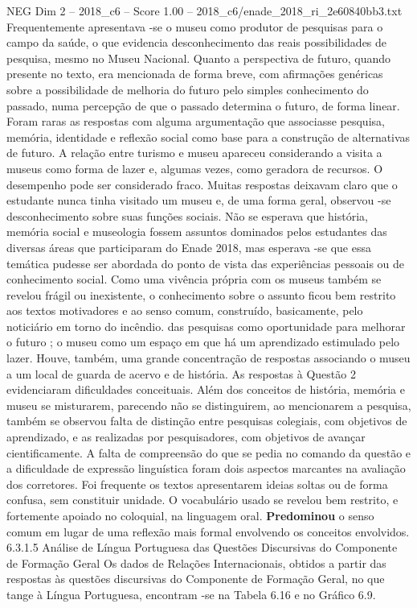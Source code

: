 \begin{textsample}{NEG Dim 2 – 2018\_c6 – Score 1.00 – 2018\_c6/enade\_2018\_ri\_2e60840bb3.txt}
Frequentemente apresentava -se o museu como produtor de pesquisas para o campo da saúde, o que evidencia desconhecimento das reais possibilidades de pesquisa, mesmo no Museu Nacional.
Quanto a perspectiva de futuro, quando presente no texto, era mencionada de forma breve, com afirmações genéricas sobre a possibilidade de melhoria do futuro pelo simples conhecimento do passado, numa percepção de que o passado determina o futuro, de forma linear.
Foram raras as respostas com alguma argumentação que associasse pesquisa, memória, identidade e reflexão social como base para a construção de alternativas de futuro.
A relação entre turismo e museu apareceu considerando a visita a museus como forma de lazer e, algumas vezes, como geradora de recursos.
O desempenho pode ser considerado fraco.
Muitas respostas deixavam claro que o estudante nunca tinha visitado um museu e, de uma forma geral, observou -se desconhecimento sobre suas funções sociais.
Não se esperava que história, memória social e museologia fossem assuntos dominados pelos estudantes das diversas áreas que participaram do Enade 2018, mas esperava -se que essa temática pudesse ser abordada do ponto de vista das experiências pessoais ou de conhecimento social.
Como uma vivência própria com os museus também se revelou frágil ou inexistente, o conhecimento sobre o assunto ficou bem restrito aos textos motivadores e ao senso comum, construído, basicamente, pelo noticiário em torno do incêndio. das pesquisas como oportunidade para melhorar o futuro ; o museu como um espaço em que há um aprendizado estimulado pelo lazer.
Houve, também, uma grande concentração de respostas associando o museu a um local de guarda de acervo e de história.
As respostas à Questão 2 evidenciaram dificuldades conceituais.
Além dos conceitos de história, memória e museu se misturarem, parecendo não se distinguirem, ao mencionarem a pesquisa, também se observou falta de distinção entre pesquisas colegiais, com objetivos de aprendizado, e as realizadas por pesquisadores, com objetivos de avançar cientificamente.
A falta de compreensão do que se pedia no comando da questão e a dificuldade de expressão linguística foram dois aspectos marcantes na avaliação dos corretores.
Foi frequente os textos apresentarem ideias soltas ou de forma confusa, sem constituir unidade.
O vocabulário usado se revelou bem restrito, e fortemente apoiado no coloquial, na linguagem oral. \textbf{Predominou} o senso comum em lugar de uma reflexão mais formal envolvendo os conceitos envolvidos. 6.3.1.5 Análise de Língua Portuguesa das Questões Discursivas do Componente de Formação Geral Os dados de Relações Internacionais, obtidos a partir das respostas às questões discursivas do Componente de Formação Geral, no que tange à Língua Portuguesa, encontram -se na Tabela 6.16 e no Gráfico 6.9.

\end{textsample}
